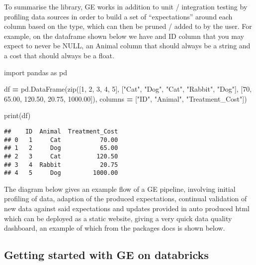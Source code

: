 \documentclass[]{article}
\newenvironment{Shaded}{\begin{snugshade}}{\end{snugshade}}
\newcommand{\BuiltInTok}[1]{#1}
\newcommand{\DecValTok}[1]{\textcolor[rgb]{0.00,0.00,0.81}{#1}}
\newcommand{\FloatTok}[1]{\textcolor[rgb]{0.00,0.00,0.81}{#1}}
\newcommand{\ImportTok}[1]{#1}
\newcommand{\NormalTok}[1]{#1}
\newcommand{\OperatorTok}[1]{\textcolor[rgb]{0.81,0.36,0.00}{\textbf{#1}}}
\newcommand{\StringTok}[1]{\textcolor[rgb]{0.31,0.60,0.02}{#1}}
\begin{document}
To summarise the library, GE works in addition to unit / integration
testing by profiling data sources in order to build a set of
``expectations'' around each column based on the type, which can then be
pruned / added to by the user. For example, on the dataframe shown below
we have and ID column that you may expect to never be NULL, an Animal
column that should always be a string and a cost that should always be a
float.

\begin{Shaded}
\begin{Highlighting}[]

\ImportTok{import}\NormalTok{ pandas }\ImportTok{as}\NormalTok{ pd}

\NormalTok{df }\OperatorTok{=}\NormalTok{ pd.DataFrame(}\BuiltInTok{zip}\NormalTok{([}\DecValTok{1}\NormalTok{, }\DecValTok{2}\NormalTok{, }\DecValTok{3}\NormalTok{, }\DecValTok{4}\NormalTok{, }\DecValTok{5}\NormalTok{], [}\StringTok{"Cat"}\NormalTok{, }\StringTok{"Dog"}\NormalTok{, }\StringTok{"Cat"}\NormalTok{, }\StringTok{"Rabbit"}\NormalTok{, }\StringTok{"Dog"}\NormalTok{], [}\DecValTok{70}\NormalTok{, }\FloatTok{65.00}\NormalTok{, }\FloatTok{120.50}\NormalTok{, }\FloatTok{20.75}\NormalTok{, }\FloatTok{1000.00}\NormalTok{]), columns }\OperatorTok{=}\NormalTok{ [}\StringTok{"ID"}\NormalTok{, }\StringTok{"Animal"}\NormalTok{, }\StringTok{"Treatment_Cost"}\NormalTok{])}

\BuiltInTok{print}\NormalTok{(df)}
\end{Highlighting}
\end{Shaded}

\begin{verbatim}
##    ID  Animal  Treatment_Cost
## 0   1     Cat           70.00
## 1   2     Dog           65.00
## 2   3     Cat          120.50
## 3   4  Rabbit           20.75
## 4   5     Dog         1000.00
\end{verbatim}

The diagram below gives an example flow of a GE pipeline, involving
initial profiling of data, adaption of the produced expectations,
continual validation of new data against said expectations and updates
provided in auto produced html which can be deployed as a static
website, giving a very quick data quality dashboard, an example of which
from the packages docs is shown below.

\hypertarget{getting-started-with-ge-on-databricks}{%
\subsection{Getting started with GE on
databricks}\label{getting-started-with-ge-on-databricks}}
\end{document}
